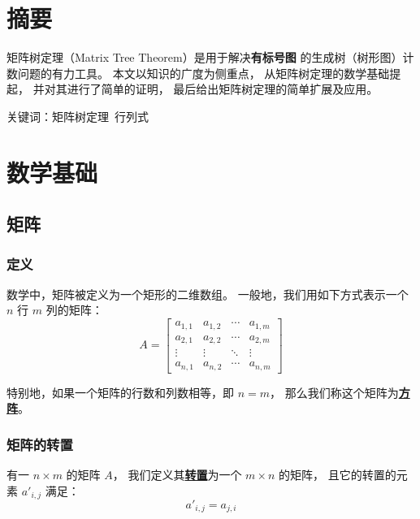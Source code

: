 \documentclass[UTF8]{article}
\title{\insertsubject}
\author{Orange}
\date{\today}
\begin{document}
	\maketitle

	\section{摘要}

	矩阵树定理（Matrix Tree Theorem）是用于解决\textbf{有标号图}
	的生成树（树形图）计数问题的有力工具。
	本文以知识的广度为侧重点，
	从矩阵树定理的数学基础提起，
	并对其进行了简单的证明，
	最后给出矩阵树定理的简单扩展及应用。

	\bigskip

	关键词：矩阵树定理~行列式

	\section{数学基础}

	\subsection{矩阵}

	\subsubsection{定义}

	数学中，矩阵被定义为一个矩形的二维数组。
	一般地，我们用如下方式表示一个 $n$ 行 $m$ 列的矩阵：
	\begin{equation*}
		A =
		\begin{bmatrix}
			a_{1, 1} & a_{1, 2} & \cdots & a_{1, m}
			\\
			a_{2, 1} & a_{2, 2} & \cdots & a_{2, m}
			\\
			\vdots & \vdots & \ddots & \vdots
			\\
			a_{n, 1} & a_{n, 2} & \cdots & a_{n, m}
		\end{bmatrix}
	\end{equation*}

	特别地，如果一个矩阵的行数和列数相等，即 $n = m$，
	那么我们称这个矩阵为\textbf{\uline{方阵}}。

	\subsubsection{矩阵的转置}

	有一 $n \times m$ 的矩阵 $A$，
	我们定义其\textbf{\uline{转置}}为一个 $m \times n$ 的矩阵，
	且它的转置的元素 $a'_{i, j}$ 满足：
	$$
	a'_{i, j} = a_{j, i}
	$$
\end{document}
